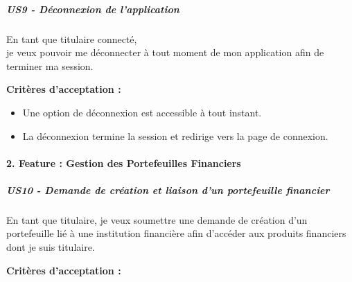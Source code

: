 \hypertarget{us9---duxe9connexion-de-lapplication}{%
\subparagraph{US9 - Déconnexion de
l'application}\label{us9---duxe9connexion-de-lapplication}}

En tant que titulaire connecté,\\
je veux pouvoir me déconnecter à tout moment de mon application afin de
terminer ma session.

\textbf{Critères d'acceptation :}

\begin{itemize}
\tightlist
\item
  Une option de déconnexion est accessible à tout instant.
\item
  La déconnexion termine la session et redirige vers la page de
  connexion.
\end{itemize}

\hypertarget{feature-gestion-des-portefeuilles-financiers}{%
\paragraph{2. Feature : Gestion des Portefeuilles
Financiers}\label{feature-gestion-des-portefeuilles-financiers}}

\hypertarget{us10---demande-de-cruxe9ation-et-liaison-dun-portefeuille-financier}{%
\subparagraph{US10 - Demande de création et liaison d'un portefeuille
financier}\label{us10---demande-de-cruxe9ation-et-liaison-dun-portefeuille-financier}}

En tant que titulaire, je veux soumettre une demande de création d'un
portefeuille lié à une institution financière afin d'accéder aux
produits financiers dont je suis titulaire.

\textbf{Critères d'acceptation :}

